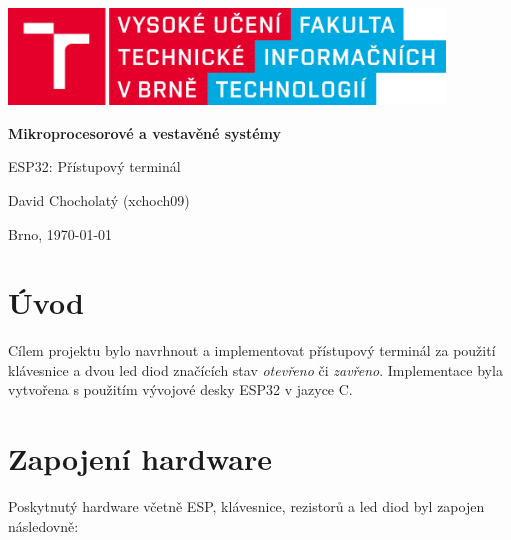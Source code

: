 \documentclass[a4paper, 12pt]{article}
\begin{document}
    \begin{titlepage}
        \begin{center}
            \includegraphics[width=0.87\textwidth]{logo_cz.png}
            \vspace*{6cm}

            \Huge{\textbf{Mikroprocesorové a vestavěné systémy}}
            \vspace{0.5cm}
            
            \LARGE{ESP32: Přístupový terminál}
            \vspace{1cm}
            
            \Large{David Chocholatý (xchoch09)}
            
           \vfill
		   \begin{flushright} 
		   Brno, \today
		   \end{flushright}
        \end{center}
    \end{titlepage}

\pagestyle{fancy}

\newpage
\tableofcontents
\newpage

\section{Úvod}
Cílem projektu bylo navrhnout a implementovat přístupový terminál za použití klávesnice a dvou led diod značících stav \textit{otevřeno} či \textit{zavřeno}. Implementace byla vytvořena s použitím vývojové desky ESP32 v jazyce C.

\section{Zapojení hardware}
Poskytnutý hardware včetně ESP, klávesnice, rezistorů a led diod byl zapojen následovně:
\end{document}
